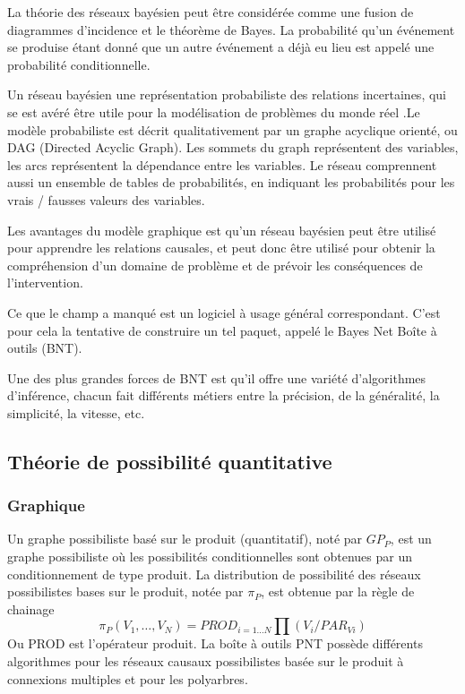 La théorie des réseaux bayésien peut être considérée comme une fusion de diagrammes d'incidence et le théorème de Bayes. La probabilité qu'un événement se produise étant donné que un autre événement a déjà eu lieu est appelé une probabilité conditionnelle. 

Un réseau bayésien une représentation probabiliste des relations incertaines, qui se est avéré être utile pour la modélisation de problèmes du monde réel .Le modèle probabiliste est décrit qualitativement par un graphe acyclique orienté, ou DAG (Directed Acyclic Graph). Les sommets du graph représentent des variables, les arcs représentent la dépendance entre les variables. Le réseau comprennent aussi un ensemble de tables de probabilités, en indiquant les probabilités pour les vrais / fausses valeurs des variables.

Les avantages du  modèle graphique est qu’un réseau bayésien peut être utilisé pour apprendre les relations causales, et peut donc être utilisé pour obtenir la compréhension d'un domaine de problème et de prévoir les conséquences de l'intervention.

Ce que le champ a manqué est un logiciel à usage général correspondant. C’est pour cela la tentative de construire un tel paquet, appelé le Bayes Net Boîte à outils (BNT).

Une des plus grandes forces de BNT est qu'il offre une variété d'algorithmes d'inférence, chacun fait différents métiers entre la précision, de la généralité, la simplicité, la vitesse, etc.


\subsection{Théorie de possibilité quantitative}

\subsubsection{Graphique}

Un graphe possibiliste basé sur le produit (quantitatif), noté par $GP_{P}$, est un graphe possibiliste où les possibilités conditionnelles sont obtenues par un conditionnement de type produit. La distribution de possibilité des réseaux possibilistes bases sur le produit, notée par $\pi_{P}$, est obtenue par la règle de chainage 
\begin{equation}
\pi_{P} (V_1, \dots , V_N) = PROD_{i=1 \dots N} \prod  (V_i/PAR_{Vi})
\end{equation}
Ou PROD est l’opérateur produit.\cite{BoBrDu2008.1}
La boîte à outils PNT possède différents algorithmes pour les réseaux causaux possibilistes basée sur le produit à connexions multiples et pour les polyarbres. 
